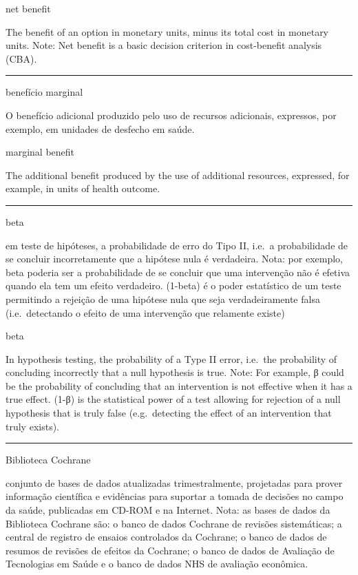\documentclass[
]{book}
\begin{document}
net benefit

The benefit of an option in monetary units, minus its total cost in monetary units. Note: Net benefit is a basic decision criterion in cost-benefit analysis (CBA).

\begin{center}\rule{0.5\linewidth}{0.5pt}\end{center}

benefício marginal

O benefício adicional produzido pelo uso de recursos adicionais, expressos, por exemplo, em unidades de desfecho em saúde.

marginal benefit

The additional benefit produced by the use of additional resources, expressed, for example, in units of health outcome.

\begin{center}\rule{0.5\linewidth}{0.5pt}\end{center}

beta

em teste de hipóteses, a probabilidade de erro do Tipo II, i.e.~a probabilidade de se concluir incorretamente que a hipótese nula é verdadeira. Nota: por exemplo, beta poderia ser a probabilidade de se concluir que uma intervenção não é efetiva quando ela tem um efeito verdadeiro. (1-beta) é o poder estatístico de um teste permitindo a rejeição de uma hipótese nula que seja verdadeiramente falsa (i.e.~detectando o efeito de uma intervenção que relamente existe)

beta

In hypothesis testing, the probability of a Type II error, i.e.~the probability of concluding incorrectly that a null hypothesis is true. Note: For example, β could be the probability of concluding that an intervention is not effective when it has a true effect. (1-β) is the statistical power of a test allowing for rejection of a null hypothesis that is truly false (e.g.~detecting the effect of an intervention that truly exists).

\begin{center}\rule{0.5\linewidth}{0.5pt}\end{center}

Biblioteca Cochrane

conjunto de bases de dados atualizadas trimestralmente, projetadas para prover informação científica e evidências para suportar a tomada de decisões no campo da saúde, publicadas em CD-ROM e na Internet. Nota: as bases de dados da Biblioteca Cochrane são: o banco de dados Cochrane de revisões sistemáticas; a central de registro de ensaios controlados da Cochrane; o banco de dados de resumos de revisões de efeitos da Cochrane; o banco de dados de Avaliação de Tecnologias em Saúde e o banco de dados NHS de avaliação econômica.
\end{document}
